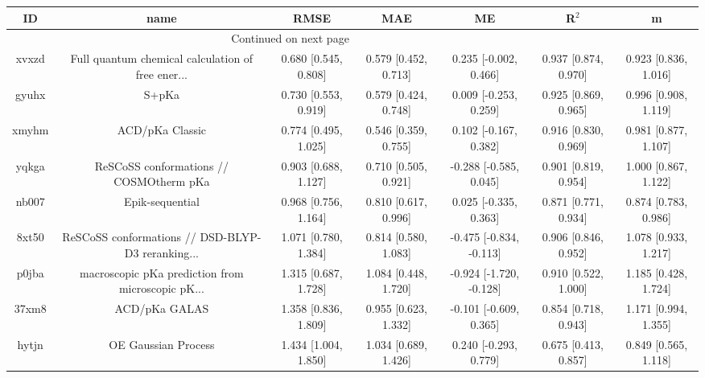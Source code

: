 \documentclass{article}
\begin{document}
\begin{center}
\begin{longtable}{|ccccccc|}
\toprule
    ID &                                               name &                  RMSE &                   MAE &                       ME &                 R$^2$ &                      m \\
\midrule
\endhead
\midrule
\multicolumn{3}{r}{{Continued on next page}} \\
\midrule
\endfoot

\bottomrule
\endlastfoot
 xvxzd &  Full quantum chemical calculation of free ener... &  0.680 [0.545, 0.808] &  0.579 [0.452, 0.713] &    0.235 [-0.002, 0.466] &  0.937 [0.874, 0.970] &   0.923 [0.836, 1.016] \\
 gyuhx &                                              S+pKa &  0.730 [0.553, 0.919] &  0.579 [0.424, 0.748] &    0.009 [-0.253, 0.259] &  0.925 [0.869, 0.965] &   0.996 [0.908, 1.119] \\
 xmyhm &                                    ACD/pKa Classic &  0.774 [0.495, 1.025] &  0.546 [0.359, 0.755] &    0.102 [-0.167, 0.382] &  0.916 [0.830, 0.969] &   0.981 [0.877, 1.107] \\
 yqkga &            ReSCoSS conformations // COSMOtherm pKa &  0.903 [0.688, 1.127] &  0.710 [0.505, 0.921] &   -0.288 [-0.585, 0.045] &  0.901 [0.819, 0.954] &   1.000 [0.867, 1.122] \\
 nb007 &                                    Epik-sequential &  0.968 [0.756, 1.164] &  0.810 [0.617, 0.996] &    0.025 [-0.335, 0.363] &  0.871 [0.771, 0.934] &   0.874 [0.783, 0.986] \\
 8xt50 &  ReSCoSS conformations // DSD-BLYP-D3 reranking... &  1.071 [0.780, 1.384] &  0.814 [0.580, 1.083] &  -0.475 [-0.834, -0.113] &  0.906 [0.846, 0.952] &   1.078 [0.933, 1.217] \\
 p0jba &  macroscopic pKa prediction from microscopic pK... &  1.315 [0.687, 1.728] &  1.084 [0.448, 1.720] &  -0.924 [-1.720, -0.128] &  0.910 [0.522, 1.000] &   1.185 [0.428, 1.724] \\
 37xm8 &                                      ACD/pKa GALAS &  1.358 [0.836, 1.809] &  0.955 [0.623, 1.332] &   -0.101 [-0.609, 0.365] &  0.854 [0.718, 0.943] &   1.171 [0.994, 1.355] \\
 hytjn &                                OE Gaussian Process &  1.434 [1.004, 1.850] &  1.034 [0.689, 1.426] &    0.240 [-0.293, 0.779] &  0.675 [0.413, 0.857] &   0.849 [0.565, 1.118] \\

\end{longtable}
\end{center}
\end{document}
